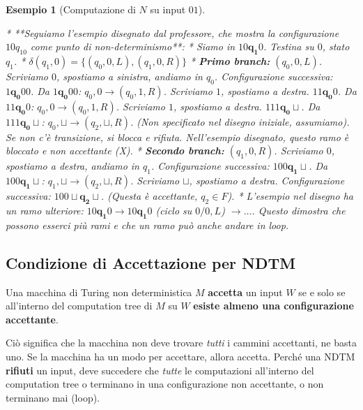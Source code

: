 \documentclass[a4paper, 11pt]{book} %
\newtheorem{example}[theorem]{Esempio}
\theoremstyle{definition}
\begin{document}
\begin{example}[Computazione di $N$ su input $01$]
\begin{enumerate}
        *   **Seguiamo l'esempio disegnato dal professore, che mostra la configurazione $10q_10$ come punto di non-determinismo**:
            *   Siamo in $10\mathbf{q_1}0$. Testina su $0$, stato $q_1$.
            *   $\delta(q_1, 0) = \{ (q_0, 0, L), (q_1, 0, R) \}$
            *   \textbf{Primo branch:} $(q_0, 0, L)$. Scriviamo $0$, spostiamo a sinistra, andiamo in $q_0$.
                Configurazione successiva: $1\mathbf{q_0}00$.
                Da $1\mathbf{q_0}00$: $q_0,0 \to (q_0,1,R)$. Scriviamo $1$, spostiamo a destra. $11\mathbf{q_0}0$.
                Da $11\mathbf{q_0}0$: $q_0,0 \to (q_0,1,R)$. Scriviamo $1$, spostiamo a destra. $111\mathbf{q_0}\sqcup$.
                Da $111\mathbf{q_0}\sqcup$: $q_0,\sqcup \to (q_2,\sqcup,R)$. (Non specificato nel disegno iniziale, assumiamo). Se non c'è transizione, si blocca e rifiuta. Nell'esempio disegnato, questo ramo è bloccato e non accettante (X).
            *   \textbf{Secondo branch:} $(q_1, 0, R)$. Scriviamo $0$, spostiamo a destra, andiamo in $q_1$.
                Configurazione successiva: $100\mathbf{q_1}\sqcup$.
                Da $100\mathbf{q_1}\sqcup$: $q_1,\sqcup \to (q_2,\sqcup,R)$. Scriviamo $\sqcup$, spostiamo a destra.
                Configurazione successiva: $100\sqcup\mathbf{q_2}\sqcup$. (Questa è accettante, $q_2 \in F$).
        *   L'esempio nel disegno ha un ramo ulteriore: $10\mathbf{q_1}0 \to 10\mathbf{q_1}0$ (ciclo su $0/0,L$) $\to \dots$. Questo dimostra che possono esserci più rami e che un ramo può anche andare in loop.

\end{enumerate}
\end{example}

\subsection{Condizione di Accettazione per NDTM}

Una macchina di Turing non deterministica $M$ \textbf{accetta} un input $W$ se e solo se all'interno del computation tree di $M$ su $W$ \textbf{esiste almeno una configurazione accettante}.

Ciò significa che la macchina non deve trovare \emph{tutti} i cammini accettanti, ne basta uno. Se la macchina ha un modo per accettare, allora accetta.
Perché una NDTM \textbf{rifiuti} un input, deve succedere che \emph{tutte} le computazioni all'interno del computation tree o terminano in una configurazione non accettante, o non terminano mai (loop).
\end{document}
